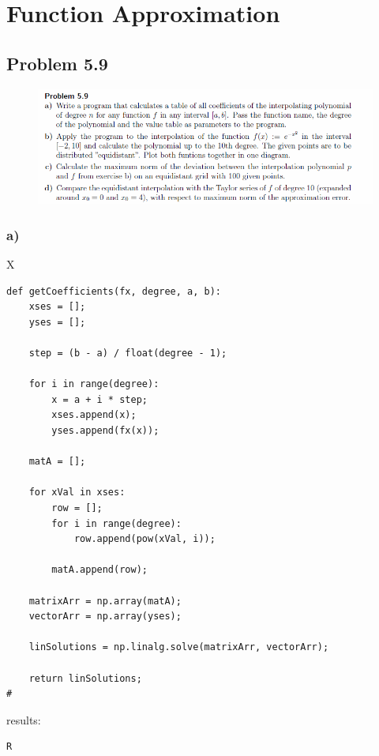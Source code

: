 \section{Function Approximation}


\subsection{Problem 5.9}


\begin{figure}[!ht]
\includegraphics[width=1\textwidth]{chapters/images/desc-5-9}
\end{figure}



\subsubsection{a)}

X

\begin{lstlisting}[caption=todo]
def getCoefficients(fx, degree, a, b):
	xses = [];
	yses = [];
	
	step = (b - a) / float(degree - 1);
	
	for i in range(degree):
		x = a + i * step;
		xses.append(x);
		yses.append(fx(x));
	
	matA = [];
	
	for xVal in xses:
		row = [];
		for i in range(degree):
			row.append(pow(xVal, i));
		
		matA.append(row);
	
	matrixArr = np.array(matA);
	vectorArr = np.array(yses);
	
	linSolutions = np.linalg.solve(matrixArr, vectorArr);
	
	return linSolutions;
#
\end{lstlisting}


results:

\begin{lstlisting}[caption=Result of 1.1 a), keywordstyle=\color{black}]
R
\end{lstlisting}

